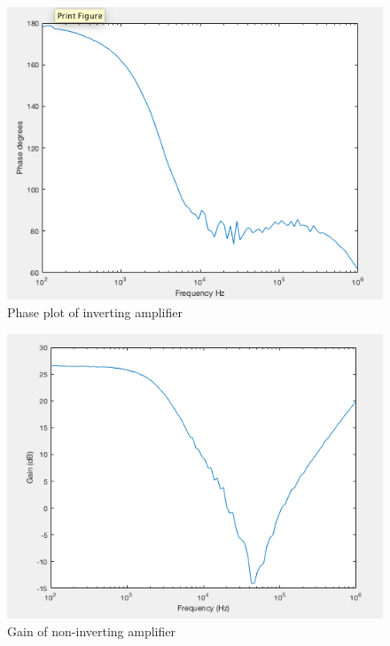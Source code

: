 		\begin{figure}[H]
	\begin{center}
		\includegraphics[scale=.40]{ExperimentalImplementation/invertingphase.png}
		\caption{Phase plot of inverting amplifier}
		\label{fig:invertingphase}
	\end{center}
\end{figure}
		
				\begin{figure}[H]
			\begin{center}
				\includegraphics[scale=.40]{ExperimentalImplementation/gainnoninverting.png}
				\caption{Gain of non-inverting amplifier}
				\label{fig:gainnoninverting}
			\end{center}
		\end{figure}
	
